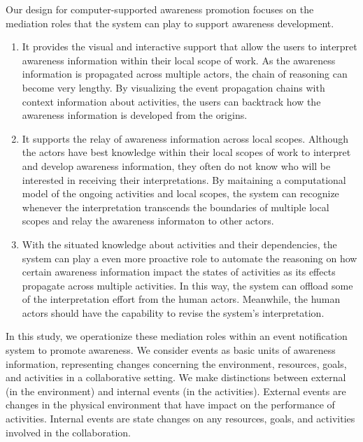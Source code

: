 Our design for computer-supported awareness promotion focuses on the mediation roles that the system can play to support awareness development. 

\begin{enumerate}
	\item It provides the visual and interactive support that allow the users to interpret awareness information within their local scope of work. As the awareness information is propagated across multiple actors, the chain of reasoning can become very lengthy. By visualizing the event propagation chains with context information about activities, the users can backtrack how the awareness information is developed from the origins.
	
	\item It supports the relay of awareness information across local scopes. Although the actors have best knowledge within their local scopes of work to interpret and develop awareness information,  they often do not know who will be interested in receiving their interpretations. By maitaining a computational model of the ongoing activities and local scopes, the system can recognize whenever the interpretation transcends the boundaries of multiple local scopes and relay the awareness informaton to other actors.
	
	\item With the situated knowledge about activities and their dependencies, the system can play a even more proactive role to automate the reasoning on how certain awareness information impact the states of activities as its effects propagate across multiple activities. In this way, the system can offload some of the interpretation effort from the human actors. Meanwhile, the human actors should have the capability to revise the system’s interpretation.
	
\end{enumerate}

In this study, we operationize these mediation roles within an event notification system to promote awareness. We consider events as basic units of awareness information, representing changes concerning the environment, resources, goals, and activities in a collaborative setting. We make distinctions between external (in the environment) and internal events (in the activities). External events are changes in the physical environment that have impact on the performance of activities. Internal events are state changes on any resources, goals, and activities involved in the collaboration.

